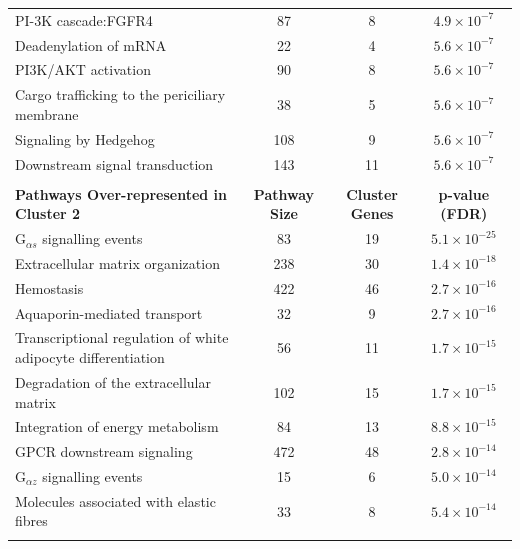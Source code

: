 \begin{table}[!Hp]
{\begin{tabular}{lccc}
  \rowcolor{Cluster_Blue!20} 
  PI-3K cascade:FGFR4 &  87 &   8 & $4.9 \times 10^{-7}$ \\ 
  \rowcolor{Cluster_Blue!15} 
  Deadenylation of mRNA &  22 &   4 & $5.6 \times 10^{-7}$ \\ 
  \rowcolor{Cluster_Blue!20} 
  PI3K/AKT activation &  90 &   8 & $5.6 \times 10^{-7}$ \\ 
  \rowcolor{Cluster_Blue!15} 
  Cargo trafficking to the periciliary membrane &  38 &   5 & $5.6 \times 10^{-7}$ \\ 
  \rowcolor{Cluster_Blue!20} 
  Signaling by Hedgehog & 108 &   9 & $5.6 \times 10^{-7}$ \\ 
  \rowcolor{Cluster_Blue!15} 
  Downstream signal transduction & 143 &  11 & $5.6 \times 10^{-7}$ \\ 
  \hline
  \\
  \cellcolor{white} \large{\textbf{Pathways Over-represented in Cluster 2}} & \large{\textbf{Pathway Size}} & \large{\textbf{Cluster Genes}} & \large{\textbf{p-value (FDR)}} \\ %
  \hline
  \rowcolor{Cluster_Green!20}
  G$_{\alpha s}$ signalling events &  83 &  19 & $5.1 \times 10^{-25}$ \\ 
  \rowcolor{Cluster_Green!15}
  Extracellular matrix organization & 238 &  30 & $1.4 \times 10^{-18}$ \\ 
  \rowcolor{Cluster_Green!20} 
  Hemostasis & 422 &  46 & $2.7 \times 10^{-16}$ \\ 
  \rowcolor{Cluster_Green!15} 
  Aquaporin-mediated transport &  32 &   9 & $2.7 \times 10^{-16}$ \\ 
  \rowcolor{Cluster_Green!20} 
  Transcriptional regulation of white adipocyte differentiation &  56 &  11 & $1.7 \times 10^{-15}$ \\ 
  \rowcolor{Cluster_Green!15} 
  Degradation of the extracellular matrix & 102 &  15 & $1.7 \times 10^{-15}$ \\ 
  \rowcolor{Cluster_Green!20} 
  Integration of energy metabolism &  84 &  13 & $8.8 \times 10^{-15}$ \\ 
  \rowcolor{Cluster_Green!15} 
  GPCR downstream signaling & 472 &  48 & $2.8 \times 10^{-14}$ \\ 
  \rowcolor{Cluster_Green!20} 
  G$_{\alpha z}$ signalling events &  15 &   6 & $5.0 \times 10^{-14}$ \\ 
  \rowcolor{Cluster_Green!15} 
  Molecules associated with elastic fibres &  33 &   8 & $5.4 \times 10^{-14}$ \\ 
  \rowcolor{Cluster_Green!20} 

\end{tabular}}
\end{table}
